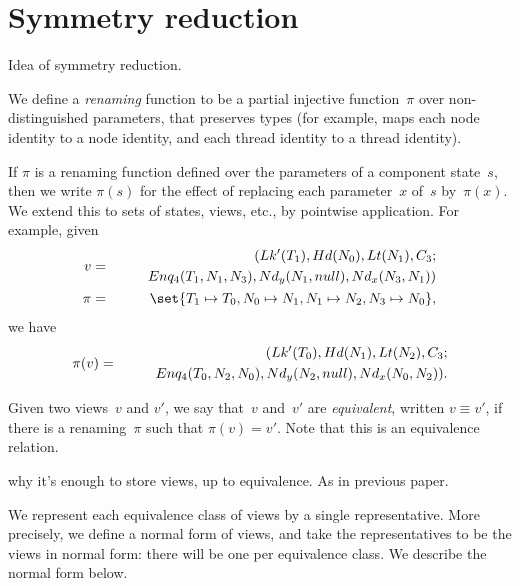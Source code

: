 \section{Symmetry reduction}
\label{sec:symmetry}


Idea of symmetry reduction.

\begin{definition}
We define a \emph{renaming} function to be a partial injective function~$\pi$
over non-distinguished parameters, that preserves types (for example, maps
each node identity to a node identity, and each thread identity to a thread
identity).

If $\pi$ is a renaming function defined over the parameters of a component
state~$s$, then we write $\pi(s)$ for the effect of replacing each
parameter~$x$ of~$s$ by~$\pi(x)$.  We extend this to sets of states, views,
etc., by pointwise application.  For example, given
%
\begin{eqnarray*}
v & = & 
  \begin{align}
  (\Lock'(T_1), \Head(N_0), \Last(N_1), \Con_3; \\
  \qquad  Enq_4(T_1, N_1, N_3), \Node_y(N_1, null),\Node_x(N_3, N_1))
  \end{align} \\
\pi & = & 
  \set{ T_1 \mapsto T_0, N_0 \mapsto N_1, N_1 \mapsto N_2, N_3 \mapsto N_0 },
\end{eqnarray*}
%
we have 
\begin{eqnarray*}
\pi(v) & = & 
  \begin{align}
  (Lk'(T_0), Hd(N_1), Lt(N_2), C_3; \\
  \qquad Enq_4(T_0, N_2, N_0), Nd_y(N_2, null),Nd_x(N_0, N_2)) .
  \end{align}
\end{eqnarray*}
\end{definition}


\begin{definition}
Given two views~$v$ and $v'$, we say that~$v$ and~$v'$ are \emph{equivalent},
written $v \equiv v'$, if there is a renaming~$\pi$ such that $\pi(v) = v'$.
Note that this is an equivalence relation.
\end{definition}


 why it's enough to store views, up to equivalence.  As in
previous paper. 

We represent each equivalence class of views by a single representative.  More
precisely, we define a normal form of views, and take the representatives to
be the views in normal form: there will be one per equivalence class.  We
describe the normal form below. 

